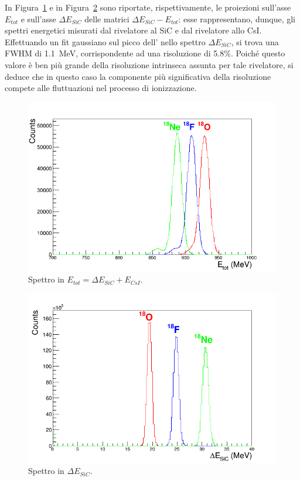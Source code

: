 In Figura~\ref{fig:ETot} e in Figura~\ref{fig:deltaE_Tot} sono riportate, rispettivamente, le proiezioni sull'asse $E_{tot}$ e sull'asse $\Delta E_{SiC}$ delle matrici $\Delta E_{SiC} - E_{tot}$: esse rappresentano, dunque, gli spettri energetici misurati dal rivelatore al SiC e dal rivelatore allo CsI.
Effettuando un fit gaussiano sul picco dell' nello spettro $\Delta E_{SiC}$, si trova una FWHM di 1.1~MeV, corrispondente ad una risoluzione di 5.8\%.
Poiché questo valore è ben più grande della risoluzione intrinseca assunta per tale rivelatore, si deduce che in questo caso la componente più significativa della risoluzione compete alle fluttuazioni nel processo di ionizzazione.


\begin{figure} [!p]
	\centering
	\includegraphics[scale=0.5]{Grafici_Tesi/Particelle_monocromatiche/ETot.png}
	\caption{Spettro in $E_{tot} = \Delta E_{SiC} + E_{CsI}$.} \label{fig:ETot}
\end{figure}


\begin{figure} [!p]
	\centering
	\includegraphics[scale=0.5]{Grafici_Tesi/Particelle_monocromatiche/deltaE_Tot.png}
	\caption{Spettro in $ \Delta E_{SiC} $.} \label{fig:deltaE_Tot}
\end{figure}









